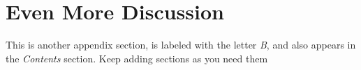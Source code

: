 \documentclass[letterpaper,12pt]{article}
\begin{document}
\section{Even More Discussion}

This is another appendix section, is labeled with the letter \textit{B}, and also appears in the \textit{Contents} section.  Keep adding sections as you need them

\newpage


\end{document}
